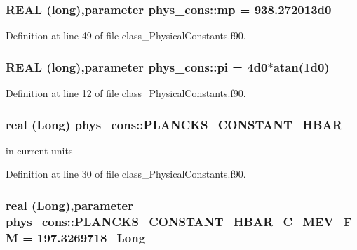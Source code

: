 \hypertarget{namespacephys__cons_ae2a4cb4e421fe399f19d0729b5617fed}{
\subsubsection[{mp}]{\setlength{\rightskip}{0pt plus 5cm}REAL (long),parameter {\bf phys\_\-cons::mp} = 938.272013d0}}
\label{namespacephys__cons_ae2a4cb4e421fe399f19d0729b5617fed}


Definition at line 49 of file class\_\-PhysicalConstants.f90.

\hypertarget{namespacephys__cons_aae3c6cb8ae765b0262bb110ff739ba9d}{
\subsubsection[{pi}]{\setlength{\rightskip}{0pt plus 5cm}REAL (long),parameter {\bf phys\_\-cons::pi} = 4d0$\ast$atan(1d0)}}
\label{namespacephys__cons_aae3c6cb8ae765b0262bb110ff739ba9d}


Definition at line 12 of file class\_\-PhysicalConstants.f90.

\hypertarget{namespacephys__cons_af0b754235993060b14fc81b7d1f702a5}{
\subsubsection[{PLANCKS\_\-CONSTANT\_\-HBAR}]{\setlength{\rightskip}{0pt plus 5cm}real (Long) {\bf phys\_\-cons::PLANCKS\_\-CONSTANT\_\-HBAR}}}
\label{namespacephys__cons_af0b754235993060b14fc81b7d1f702a5}


in current units 



Definition at line 30 of file class\_\-PhysicalConstants.f90.

\hypertarget{namespacephys__cons_a7efa4134b36e258435906be7fd9ca165}{
\subsubsection[{PLANCKS\_\-CONSTANT\_\-HBAR\_\-C\_\-MEV\_\-FM}]{\setlength{\rightskip}{0pt plus 5cm}real (Long),parameter {\bf phys\_\-cons::PLANCKS\_\-CONSTANT\_\-HBAR\_\-C\_\-MEV\_\-FM} = 197.3269718\_\-Long}}
\label{namespacephys__cons_a7efa4134b36e258435906be7fd9ca165}


